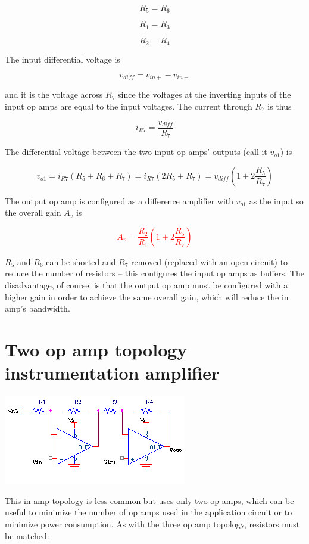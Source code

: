 \begin{equation}
R_{5} = R_{6}
\end{equation}

\begin{equation}
R_{1} = R_{3}
\end{equation}

\begin{equation}
R_{2} = R_{4}
\end{equation}

The input differential voltage is

\begin{equation}
v_{diff} = v_{in+}-v_{in-}
\end{equation}

and it is the voltage across $R_{7}$ since the voltages at the inverting inputs of the input op amps are equal to the input voltages. The current through $R_{7}$ is thus

\begin{equation}
i_{R7} = \frac{v_{diff}}{R_{7}}
\end{equation}

The differential voltage between the two input op amps' outputs (call it $v_{o1}$) is

\begin{equation}
v_{o1} = i_{R7}(R_{5}+R_{6}+R_{7}) = i_{R7}(2R_{5}+R_{7}) = v_{diff}(1+2\frac{R_{5}}{R_{7}})
\end{equation}

The output op amp is configured as a difference amplifier with $v_{o1}$ as the input so the overall gain $A_{v}$ is

\textcolor{red}{
\begin{equation}
A_{v} = \frac{R_{2}}{R_{1}}(1+2\frac{R_{5}}{R_{7}})
\label{eq:threeinamp}
\end{equation}
}

$R_{5}$ and $R_{6}$ can be shorted and $R_{7}$ removed (replaced with an open circuit) to reduce the number of resistors -- this configures the input op amps as buffers.
The disadvantage, of course, is that the output op amp must be configured with a higher gain in order to achieve the same overall gain, which will reduce the in amp's bandwidth.

\section{Two op amp topology instrumentation amplifier}
\begin{center}
	\includegraphics{schematics/twoinamp.PNG}
\end{center}
This in amp topology is less common but uses only two op amps, which can be useful to minimize the number of op amps used in the application circuit or to minimize power consumption.
As with the three op amp topology, resistors must be matched:

